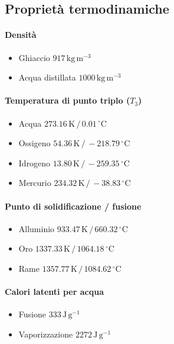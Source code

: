 \documentclass[10pt, oneside]{book}
\begin{document}
\subsection*{Proprietà termodinamiche}
\paragraph{Densità}
\begin{itemize}
\item Ghiaccio \dotfill $ 917 \, \mathrm{kg \, m^{-3}}$
\item Acqua distillata \dotfill $ 1000 \, \mathrm{kg \, m^{-3}}$
\end{itemize}
\paragraph{Temperatura di punto triplo ($T_3$)}
\begin{itemize}
\item Acqua \dotfill $273.16 \, \mathrm{K} \, \big/ \, 0.01 \, \mathrm{{}^{\circ} C}$
\item Ossigeno \dotfill $54.36 \, \mathrm{K} \, \big/ \, -218.79 \, \mathrm{{}^{\circ} C}$
\item Idrogeno \dotfill $13.80 \, \mathrm{K} \, \big/ \, -259.35 \, \mathrm{{}^{\circ} C}$
\item Mercurio \dotfill $234.32 \, \mathrm{K} \, \big/ \, -38.83 \, \mathrm{{}^{\circ} C}$
\end{itemize}
\paragraph{Punto di solidificazione / fusione}
\begin{itemize}
\item Alluminio \dotfill $933.47 \, \mathrm{K} \, \big/ \, 660.32 \, \mathrm{{}^{\circ} C}$
\item Oro \dotfill $1337.33 \, \mathrm{K} \, \big/ \, 1064.18 \, \mathrm{{}^{\circ} C}$
\item Rame \dotfill $1357.77 \, \mathrm{K} \, \big/ \, 1084.62 \, \mathrm{{}^{\circ} C}$
\end{itemize}
\paragraph{Calori latenti per acqua}
\begin{itemize}
\item Fusione \dotfill $ 333 \, \mathrm{J \, g^{-1}}$
\item Vaporizzazione \dotfill $ 2272 \, \mathrm{J \, g^{-1}}$
\end{itemize}
\end{document}
